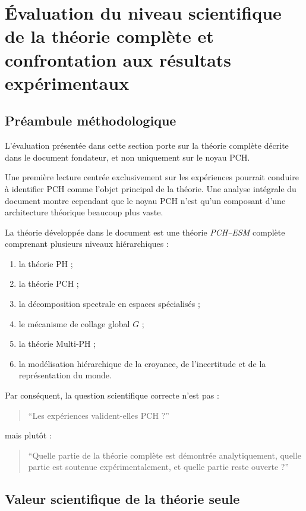 \section{Évaluation du niveau scientifique de la théorie complète et confrontation aux résultats expérimentaux}

\subsection{Préambule méthodologique}

L'évaluation présentée dans cette section porte sur la théorie complète décrite dans le document fondateur, et non uniquement sur le noyau PCH.

Une première lecture centrée exclusivement sur les expériences pourrait conduire à identifier PCH comme l'objet principal de la théorie. Une analyse intégrale du document montre cependant que le noyau PCH n'est qu'un composant d'une architecture théorique beaucoup plus vaste.

La théorie développée dans le document est une théorie \emph{PCH--ESM} complète comprenant plusieurs niveaux hiérarchiques :

\begin{enumerate}
    \item la théorie PH ;
    \item la théorie PCH ;
    \item la décomposition spectrale en espaces spécialisés ;
    \item le mécanisme de collage global \(G\) ;
    \item la théorie Multi-PH ;
    \item la modélisation hiérarchique de la croyance, de l'incertitude et de la représentation du monde.
\end{enumerate}

Par conséquent, la question scientifique correcte n'est pas :

\begin{quote}
``Les expériences valident-elles PCH ?''
\end{quote}

mais plutôt :

\begin{quote}
``Quelle partie de la théorie complète est démontrée analytiquement, quelle partie est soutenue expérimentalement, et quelle partie reste ouverte ?''
\end{quote}

\subsection{Valeur scientifique de la théorie seule}

